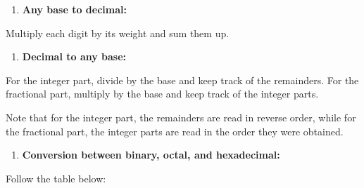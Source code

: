 \documentclass[11pt,a4paper]{article}
\providecommand{\tightlist}{\setlength{\itemsep}{1pt}\setlength{\parskip}{0pt}}
\begin{document}
\begin{enumerate}
\def\labelenumi{\arabic{enumi}.}
\tightlist
\item
  \textbf{Any base to decimal:}
\end{enumerate}

Multiply each digit by its weight and sum them up.

\begin{enumerate}
\def\labelenumi{\arabic{enumi}.}
\setcounter{enumi}{1}
\tightlist
\item
  \textbf{Decimal to any base:}
\end{enumerate}

For the integer part, divide by the base and keep track of the
remainders. For the fractional part, multiply by the base and keep track
of the integer parts.

Note that for the integer part, the remainders are read in reverse
order, while for the fractional part, the integer parts are read in the
order they were obtained.

\begin{enumerate}
\def\labelenumi{\arabic{enumi}.}
\setcounter{enumi}{2}
\tightlist
\item
  \textbf{Conversion between binary, octal, and hexadecimal:}
\end{enumerate}

Follow the table below:
\end{document}
